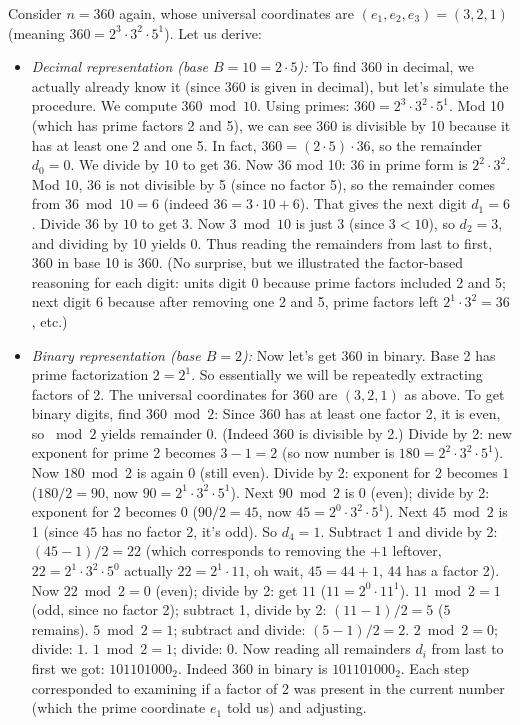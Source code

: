 \documentclass[11pt]{article}
\begin{document}
\begin{example}
Consider $n = 360$ again, whose universal coordinates are $(e_1,e_2,e_3) = (3,2,1)$ (meaning $360 = 2^3 \cdot 3^2 \cdot 5^1$). Let us derive:
\begin{itemize}
  \item \textit{Decimal representation (base $B=10=2\cdot 5$):} To find $360$ in decimal, we actually already know it (since 360 is given in decimal), but let's simulate the procedure. We compute $360 \bmod 10$. Using primes: $360 = 2^3\cdot3^2\cdot5^1$. Mod 10 (which has prime factors 2 and 5), we can see $360$ is divisible by 10 because it has at least one 2 and one 5. In fact, $360 = (2\cdot5)\cdot 36$, so the remainder $d_0 = 0$. We divide by 10 to get $36$. Now $36$ mod 10: $36$ in prime form is $2^2\cdot3^2$. Mod 10, $36$ is not divisible by 5 (since no factor 5), so the remainder comes from $36 \bmod 10 = 6$ (indeed $36 = 3\cdot 10 + 6$). That gives the next digit $d_1 = 6$. Divide $36$ by $10$ to get $3$. Now $3 \bmod 10$ is just 3 (since $3 < 10$), so $d_2 = 3$, and dividing by 10 yields $0$. Thus reading the remainders from last to first, $360$ in base 10 is $360$. (No surprise, but we illustrated the factor-based reasoning for each digit: units digit 0 because prime factors included 2 and 5; next digit 6 because after removing one 2 and 5, prime factors left $2^1\cdot3^2 = 36$, etc.)
  \item \textit{Binary representation (base $B=2$):} Now let's get $360$ in binary. Base 2 has prime factorization $2=2^1$. So essentially we will be repeatedly extracting factors of 2. The universal coordinates for 360 are $(3,2,1)$ as above. To get binary digits, find $360 \bmod 2$: Since $360$ has at least one factor 2, it is even, so $\bmod 2$ yields remainder $0$. (Indeed $360$ is divisible by 2.) Divide by 2: new exponent for prime 2 becomes $3-1=2$ (so now number is $180 = 2^2\cdot3^2\cdot5^1$). Now $180 \bmod 2$ is again 0 (still even). Divide by 2: exponent for 2 becomes $1$ ($180/2 = 90$, now $90=2^1\cdot3^2\cdot5^1$). Next $90 \bmod 2$ is 0 (even); divide by 2: exponent for 2 becomes $0$ ($90/2 = 45$, now $45=2^0\cdot3^2\cdot5^1$). Next $45 \bmod 2$ is 1 (since $45$ has no factor 2, it's odd). So $d_4 = 1$. Subtract 1 and divide by 2: $(45-1)/2 = 22$ (which corresponds to removing the $+1$ leftover, $22 = 2^1\cdot 3^2\cdot5^0$ actually $22=2^1\cdot11$, oh wait, $45 = 44+1$, $44$ has a factor 2). Now $22 \bmod 2 = 0$ (even); divide by 2: get $11$ ($11=2^0\cdot 11^1$). $11 \bmod 2 = 1$ (odd, since no factor 2); subtract 1, divide by 2: $(11-1)/2 = 5$ ($5$ remains). $5 \bmod 2 = 1$; subtract and divide: $(5-1)/2 = 2$. $2 \bmod 2 = 0$; divide: $1$. $1 \bmod 2 = 1$; divide: $0$. Now reading all remainders $d_i$ from last to first we got: $101101000_2$. Indeed $360$ in binary is $101101000_2$. Each step corresponded to examining if a factor of 2 was present in the current number (which the prime coordinate $e_1$ told us) and adjusting.

\end{itemize}
\end{example}
\end{document}
